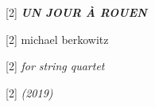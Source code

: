 \documentclass{article}
\newlength{\drop}
\begin{document}
    \begin{titlepage}


        \textheight
        \centering

        \vspace*{20\baselineskip}
        {
            \scalebox{1}[2]
            {\fontsize{1.5cm}{1em}\selectfont \textit{\textbf{UN \hspace{.2em} JOUR \hspace{.2em} À \hspace{.2em} ROUEN}}}
        }
        \vspace*{1\baselineskip}


        {
          \begin{flushright}
            \scalebox{1}[2]
            {\fontsize{.75cm}{1em}\selectfont michael \hspace{1pt} berkowitz \hspace{1pt}}
          \end{flushright}
        }


        \vfill

        {
            \scalebox{1}[2]
            {\fontsize{0.5cm}{1em}\selectfont \itshape for string quartet}
        }

        \vspace*{1\baselineskip}

        {
            \scalebox{1}[2]
            {\fontsize{0.5cm}{1em}\selectfont \itshape (2019)}
        }


    \end{titlepage}
\end{document}

